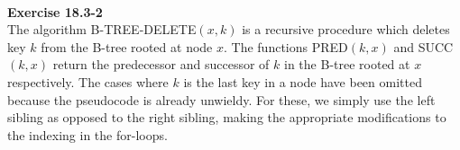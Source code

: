 \documentclass{article}
\begin{document}

\\

\noindent\textbf{Exercise 18.3-2}\\

The algorithm B-TREE-DELETE$(x,k)$ is a recursive procedure which deletes key $k$ from the B-tree rooted at node $x$. The functions PRED$(k,x)$ and SUCC$(k,x)$ return the predecessor and successor of $k$ in the B-tree rooted at $x$ respectively.  The cases where $k$ is the last key in a node have been omitted because the pseudocode is already unwieldy.  For these, we simply use the left sibling as opposed to the right sibling, making the appropriate modifications to the indexing in the for-loops. \\
\end{document}
